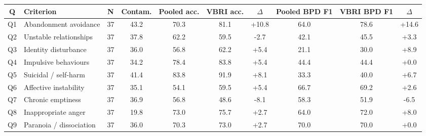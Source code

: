 \begin{tabular}{@{}clcccccccc@{}}
\toprule
\textbf{Q} & \textbf{Criterion} & \textbf{N} & \textbf{Contam.} & \textbf{Pooled acc.} & \textbf{VBRI acc.} & \textbf{$\Delta$} & \textbf{Pooled BPD F1} & \textbf{VBRI BPD F1} & \textbf{$\Delta$} \\
\midrule
Q1 & Abandonment avoidance & 37 & 43.2 & 70.3 & 81.1 & +10.8 & 64.0 & 78.6 & +14.6 \\
Q2 & Unstable relationships & 37 & 37.8 & 62.2 & 59.5 & -2.7 & 42.1 & 45.5 & +3.3 \\
Q3 & Identity disturbance & 37 & 36.0 & 56.8 & 62.2 & +5.4 & 21.1 & 30.0 & +8.9 \\
Q4 & Impulsive behaviours & 37 & 34.2 & 78.4 & 83.8 & +5.4 & 44.4 & 44.4 & +0.0 \\
Q5 & Suicidal / self-harm & 37 & 41.4 & 83.8 & 91.9 & +8.1 & 33.3 & 40.0 & +6.7 \\
Q6 & Affective instability & 37 & 35.1 & 54.1 & 59.5 & +5.4 & 66.7 & 69.2 & +2.6 \\
Q7 & Chronic emptiness & 37 & 36.9 & 56.8 & 48.6 & -8.1 & 58.3 & 51.9 & -6.5 \\
Q8 & Inappropriate anger & 37 & 19.8 & 73.0 & 75.7 & +2.7 & 64.0 & 72.0 & +8.0 \\
Q9 & Paranoia / dissociation & 37 & 36.0 & 70.3 & 73.0 & +2.7 & 70.0 & 70.0 & +0.0 \\
\bottomrule
\end{tabular}
